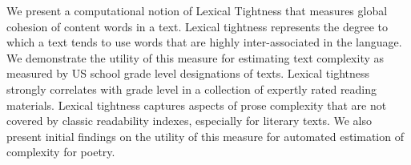 We present a computational notion of Lexical Tightness that measures global cohesion of content
 words in a text. Lexical tightness represents
 the degree to which a text tends to use words
 that are highly inter-associated in the language.
 We demonstrate the utility of this measure for
 estimating text complexity as measured by US
 school grade level designations of texts. Lexical
 tightness strongly correlates with grade level in
 a collection of expertly rated reading materials.
 Lexical tightness captures aspects of prose
 complexity that are not covered by classic readability
 indexes, especially for literary texts. We
 also present initial findings on the utility of this
 measure for automated estimation of complexity
 for poetry.

